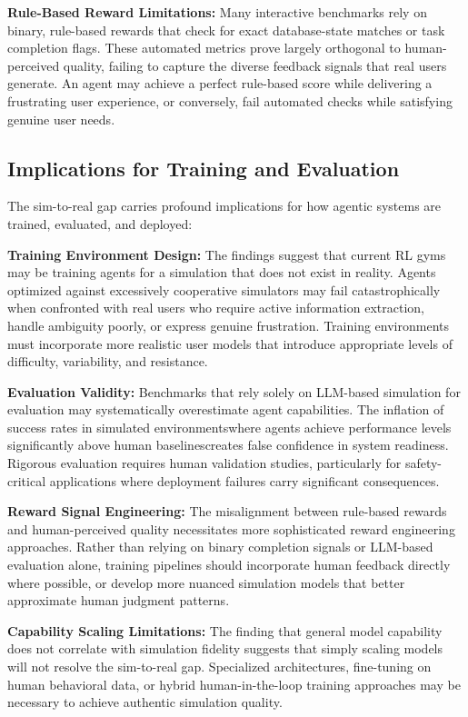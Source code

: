 \textbf{Rule-Based Reward Limitations:} Many interactive benchmarks rely on binary, rule-based rewards that check for exact database-state matches or task completion flags. These automated metrics prove largely orthogonal to human-perceived quality, failing to capture the diverse feedback signals that real users generate. An agent may achieve a perfect rule-based score while delivering a frustrating user experience, or conversely, fail automated checks while satisfying genuine user needs.

\subsection{Implications for Training and Evaluation}

The sim-to-real gap carries profound implications for how agentic systems are trained, evaluated, and deployed:

\textbf{Training Environment Design:} The findings suggest that current RL gyms may be training agents for a simulation that does not exist in reality. Agents optimized against excessively cooperative simulators may fail catastrophically when confronted with real users who require active information extraction, handle ambiguity poorly, or express genuine frustration. Training environments must incorporate more realistic user models that introduce appropriate levels of difficulty, variability, and resistance.

\textbf{Evaluation Validity:} Benchmarks that rely solely on LLM-based simulation for evaluation may systematically overestimate agent capabilities. The inflation of success rates in simulated environmentswhere agents achieve performance levels significantly above human baselinescreates false confidence in system readiness. Rigorous evaluation requires human validation studies, particularly for safety-critical applications where deployment failures carry significant consequences.

\textbf{Reward Signal Engineering:} The misalignment between rule-based rewards and human-perceived quality necessitates more sophisticated reward engineering approaches. Rather than relying on binary completion signals or LLM-based evaluation alone, training pipelines should incorporate human feedback directly where possible, or develop more nuanced simulation models that better approximate human judgment patterns.

\textbf{Capability Scaling Limitations:} The finding that general model capability does not correlate with simulation fidelity suggests that simply scaling models will not resolve the sim-to-real gap. Specialized architectures, fine-tuning on human behavioral data, or hybrid human-in-the-loop training approaches may be necessary to achieve authentic simulation quality.

